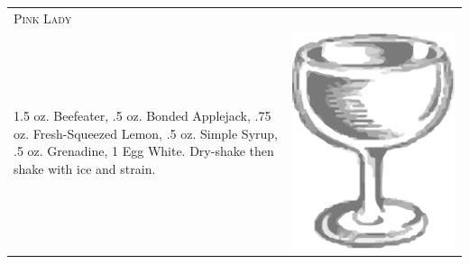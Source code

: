 \documentclass{article}
\begin{document}
\begin{multicols}{2}
\begin{tabular}{p{2in} p{0.5in}}
\multicolumn{2}{p{3in}}{\centering\Huge\textsc{Pink Lady}} \\ 
   \vspace{-0.1in}1.5 oz. Beefeater, .5 oz. Bonded Applejack, .75 oz. Fresh-Squeezed Lemon, .5 oz. Simple Syrup, .5 oz. Grenadine, 1 Egg White. Dry-shake then shake with ice and strain. &
   \vspace{-0.1in} \includegraphics{coupe.png}
\end{tabular}


\end{multicols}
\end{document}
